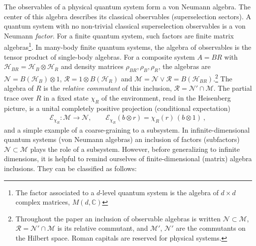 \documentclass[a4paper,11pt]{article}
\theoremstyle{definition}
\newcommand{\mR}{\mathcal{R}}
\newcommand{\mN}{\mathcal{N}}
\newcommand{\mM}{\mathcal{M}}
\newcommand{\mE}{\mathcal{E}}
\begin{document}
The observables of a physical quantum system form a von Neumann algebra. The center of this algebra describes its classical observables (superselection sectors). A quantum system with no non-trivial classical superselection observables is a von Neumann \emph{factor}. For a finite quantum system, such factors are
finite matrix algebras\footnote{The factor associated to a $d$-level quantum system is the algebra of $d\times d$ complex matrices, $M(d,\mathbb{C})$}. In many-body finite quantum systems, the algebra of observables is the tensor product of single-body algebras. For a composite system $A=BR$ with $\mathcal H_{BR}=\mathcal H_B\otimes\mathcal H_R$ and density matrices $\rho_{BR},\rho_B,\rho_R$, the algebras are $\mN=B(\mathcal H_B)\otimes1$, $\mR=1\otimes B(\mathcal H_R)$ and $\mM=\mN\vee\mR=B(\mathcal H_{BR})$.\footnote{Throughout the paper an inclusion of observable algebras is written $\mN\subset\mM$, $\mR=\mN'\cap\mM$ is its relative commutant, and $\mM'$, $\mN'$ are the commutants on the Hilbert space. Roman capitals are reserved for physical systems.} 
The algebra of $R$ is the \emph{relative commutant} of this inclusion, $\mR=\mN'\cap\mM$.
The partial trace over $R$ in a fixed state $\chi_R$ of the environment, read in the Heisenberg picture, is a unital completely positive projection (conditional expectation)
\begin{align}
    \mE_{\chi_R}:\mM\to\mN,\qquad
    \mE_{\chi_R}(b\otimes r)=\chi_R(r)\,(b\otimes 1)\ ,
    \label{eq:slice-expectation-intro}
\end{align}
and a simple example of a coarse-graining to a subsystem. In infinite-dimensional quantum systems (von Neumann algebras) an inclusion of factors (subfactors) $\mN\subset\mM$ plays the role of a subsystem. However, before generalizing to infinite dimensions, it is helpful to remind ourselves of finite-dimensional (matrix) algebra inclusions. They can be classified as follows:

\end{document}
